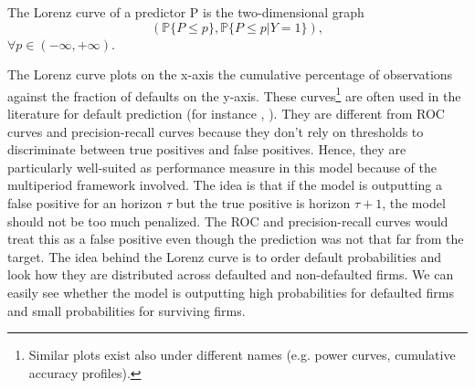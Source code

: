 
\begin{definition}
The Lorenz curve of a predictor P is the two-dimensional graph
\begin{equation*}
    (\mathbb{P}\{P \leq p\},\mathbb{P}\{P\leq p | Y = 1\}),
\end{equation*}
$\forall p \in (-\infty,+\infty)$.
\end{definition}

The Lorenz curve plots on the x-axis the cumulative percentage of observations against the fraction of defaults on the y-axis.
These curves\footnote{Similar plots exist also under different names (e.g. power curves, cumulative accuracy profiles).} are often used in the literature for default prediction (for instance \citet{leippold}, \citet{Duan2012}). They are different from ROC curves and precision-recall curves because they don't rely on thresholds to discriminate between true positives and false positives. Hence, they are particularly well-suited as performance measure in this model because of the multiperiod framework involved. The idea is that if the model is outputting a false positive for an horizon $\tau$ but the true positive is horizon $\tau+1$, the model should not be too much penalized. The ROC and precision-recall curves would treat this as a false positive even though the prediction was not that far from the target. The idea behind the Lorenz curve is to order default probabilities and look how they are distributed across defaulted and non-defaulted firms. We can easily see whether the model is outputting high probabilities for defaulted firms and small probabilities for surviving firms. 

